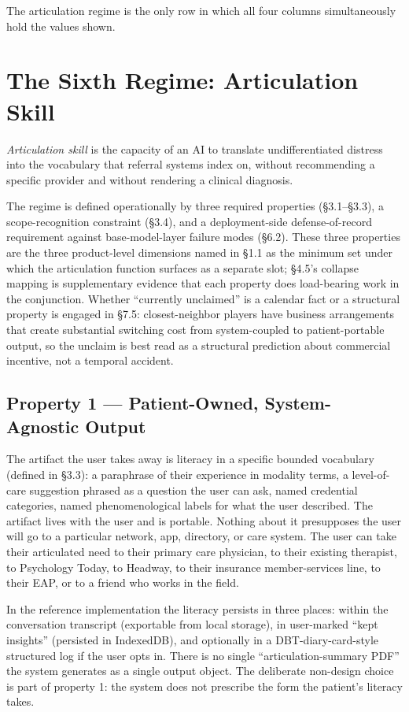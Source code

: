 \documentclass[letterpaper]{article}
\begin{document}
The articulation regime is the only row in which all four columns simultaneously hold the values shown.

\section{The Sixth Regime: Articulation Skill}

\emph{Articulation skill} is the capacity of an AI to translate undifferentiated distress into the vocabulary that referral systems index on, without recommending a specific provider and without rendering a clinical diagnosis.

The regime is defined operationally by three required properties (\S3.1--\S3.3), a scope-recognition constraint (\S3.4), and a deployment-side defense-of-record requirement against base-model-layer failure modes (\S6.2). These three properties are the three product-level dimensions named in \S1.1 as the minimum set under which the articulation function surfaces as a separate slot; \S4.5's collapse mapping is supplementary evidence that each property does load-bearing work in the conjunction. Whether ``currently unclaimed'' is a calendar fact or a structural property is engaged in \S7.5: closest-neighbor players have business arrangements that create substantial switching cost from system-coupled to patient-portable output, so the unclaim is best read as a structural prediction about commercial incentive, not a temporal accident.

\subsection{Property 1 --- Patient-Owned, System-Agnostic Output}

The artifact the user takes away is literacy in a specific bounded vocabulary (defined in \S3.3): a paraphrase of their experience in modality terms, a level-of-care suggestion phrased as a question the user can ask, named credential categories, named phenomenological labels for what the user described. The artifact lives with the user and is portable. Nothing about it presupposes the user will go to a particular network, app, directory, or care system. The user can take their articulated need to their primary care physician, to their existing therapist, to Psychology Today, to Headway, to their insurance member-services line, to their EAP, or to a friend who works in the field.

In the reference implementation the literacy persists in three places: within the conversation transcript (exportable from local storage), in user-marked ``kept insights'' (persisted in IndexedDB), and optionally in a DBT-diary-card-style structured log if the user opts in. There is no single ``articulation-summary PDF'' the system generates as a single output object. The deliberate non-design choice is part of property 1: the system does not prescribe the form the patient's literacy takes.
\end{document}
